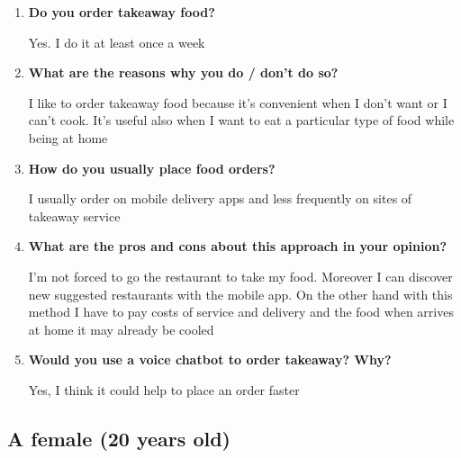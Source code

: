 \begin{enumerate}

\item \textbf{Do you order takeaway food?}

Yes. I do it at least once a week

\item \textbf{What are the reasons why you do / don't do so?}

I like to order takeaway food because it's convenient when I don't want or I can't cook. It's useful also when I want to eat a particular type of food while being at home

\item \textbf{How do you usually place food orders?}

I usually order on mobile delivery apps and less frequently on sites of takeaway service

\item \textbf{What are the pros and cons about this approach in your opinion?}

I'm not forced to go the restaurant to take my food. Moreover I can discover new suggested restaurants with the mobile app. On the other hand with this method I have to pay costs of service and delivery and the food when arrives at home it may already be cooled

\item \textbf{Would you use a voice chatbot to order takeaway? Why?}

Yes, I think it could help to place an order faster

\end{enumerate}


\subsection*{A female (20 years old)}

